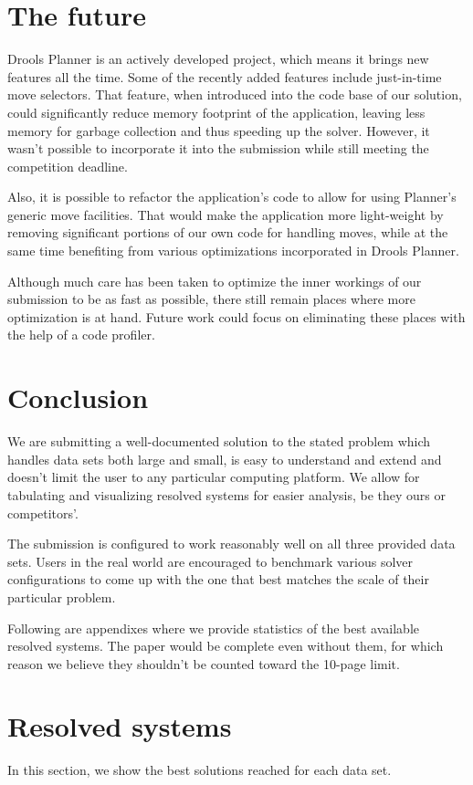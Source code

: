 \documentclass[10pt,a4paper,final]{article}
\begin{document}


\section{The future}

Drools Planner is an actively developed project, which means it brings new features all the time. Some of the recently added features include just-in-time move selectors. That feature, when introduced into the code base of our solution, could significantly reduce memory footprint of the application, leaving less memory for garbage collection and thus speeding up the solver. However, it wasn't possible to incorporate it into the submission while still meeting the competition deadline.

Also, it is possible to refactor the application's code to allow for using Planner's generic move facilities. That would make the application more light-weight by removing significant portions of our own code for handling moves, while at the same time benefiting from various optimizations incorporated in Drools Planner.

Although much care has been taken to optimize the inner workings of our submission to be as fast as possible, there still remain places where more optimization is at hand. Future work could focus on eliminating these places with the help of a code profiler.

\section{Conclusion}

We are submitting a well-documented solution to the stated problem which handles data sets both large and small, is easy to understand and extend and doesn't limit the user to any particular computing platform. We allow for tabulating and visualizing resolved systems for easier analysis, be they ours or competitors'.

The submission is configured to work reasonably well on all three provided data sets. Users in the real world are encouraged to benchmark various solver configurations to come up with the one that best matches the scale of their particular problem.

\appendix

Following are appendixes where we provide statistics of the best available resolved systems. The paper would be complete even without them, for which reason we believe they shouldn't be counted toward the 10-page limit.

\section{Resolved systems}

In this section, we show the best solutions reached for each data set. 





\end{document}
